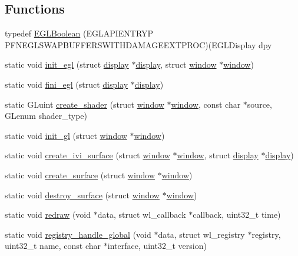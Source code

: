 \subsection*{Functions}
\begin{DoxyCompactItemize}
\item 
typedef \hyperlink{simple-egl_8cpp_ab4ad070d3bf82abe5e70330578f67893}{E\+G\+L\+Boolean} (E\+G\+L\+A\+P\+I\+E\+N\+T\+R\+YP P\+F\+N\+E\+G\+L\+S\+W\+A\+P\+B\+U\+F\+F\+E\+R\+S\+W\+I\+T\+H\+D\+A\+M\+A\+G\+E\+E\+X\+T\+P\+R\+OC)(E\+G\+L\+Display dpy
\item 
static void \hyperlink{simple-egl_8cpp_a1073d4aca1838d3877fe577d813700fc}{init\+\_\+egl} (struct \hyperlink{structdisplay}{display} $\ast$\hyperlink{structdisplay}{display}, struct \hyperlink{structwindow}{window} $\ast$\hyperlink{structwindow}{window})
\item 
static void \hyperlink{simple-egl_8cpp_a4f71f46ede5b73bd7c770c973826f771}{fini\+\_\+egl} (struct \hyperlink{structdisplay}{display} $\ast$\hyperlink{structdisplay}{display})
\item 
static G\+Luint \hyperlink{simple-egl_8cpp_ab72c580e4d6d47c2fb49c72cc76b85bb}{create\+\_\+shader} (struct \hyperlink{structwindow}{window} $\ast$\hyperlink{structwindow}{window}, const char $\ast$source, G\+Lenum shader\+\_\+type)
\item 
static void \hyperlink{simple-egl_8cpp_ab3ee863fa45f4026f78f592d6f6e34ff}{init\+\_\+gl} (struct \hyperlink{structwindow}{window} $\ast$\hyperlink{structwindow}{window})
\item 
static void \hyperlink{simple-egl_8cpp_a0122201fe28a7f35b0fbd362fff7094e}{create\+\_\+ivi\+\_\+surface} (struct \hyperlink{structwindow}{window} $\ast$\hyperlink{structwindow}{window}, struct \hyperlink{structdisplay}{display} $\ast$\hyperlink{structdisplay}{display})
\item 
static void \hyperlink{simple-egl_8cpp_a83c7f2e34bbc715d97f0642def708293}{create\+\_\+surface} (struct \hyperlink{structwindow}{window} $\ast$\hyperlink{structwindow}{window})
\item 
static void \hyperlink{simple-egl_8cpp_aba2ea9aa51701e52d4f36b4f34cecf7a}{destroy\+\_\+surface} (struct \hyperlink{structwindow}{window} $\ast$\hyperlink{structwindow}{window})
\item 
static void \hyperlink{simple-egl_8cpp_a927502f6103ec35422eead39e62ab7ba}{redraw} (void $\ast$data, struct wl\+\_\+callback $\ast$callback, uint32\+\_\+t time)
\item 
static void \hyperlink{simple-egl_8cpp_af288e02a94c196a68b327fc55c049932}{registry\+\_\+handle\+\_\+global} (void $\ast$data, struct wl\+\_\+registry $\ast$registry, uint32\+\_\+t name, const char $\ast$interface, uint32\+\_\+t version)

\end{DoxyCompactItemize}
